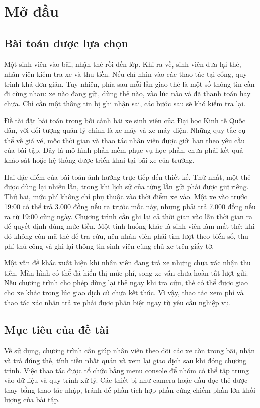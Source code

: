 \chapter{Mở đầu}
\label{chap:introduction}

\section{Bài toán được lựa chọn}
Một sinh viên vào bãi, nhận thẻ rồi đến lớp. Khi ra về, sinh viên đưa lại thẻ, nhân viên kiểm tra xe và thu tiền. Nếu chỉ nhìn vào các thao tác tại cổng, quy trình khá đơn giản. Tuy nhiên, phía sau mỗi lần giao thẻ là một số thông tin cần đi cùng nhau: xe nào đang gửi, dùng thẻ nào, vào lúc nào và đã thanh toán hay chưa. Chỉ cần một thông tin bị ghi nhận sai, các bước sau sẽ khó kiểm tra lại.

Đề tài đặt bài toán trong bối cảnh bãi xe sinh viên của Đại học Kinh tế Quốc dân, với đối tượng quản lý chính là xe máy và xe máy điện. Những quy tắc cụ thể về giá vé, mốc thời gian và thao tác nhân viên được giới hạn theo yêu cầu của bài tập. Đây là mô hình phần mềm phục vụ học phần, chưa phải kết quả khảo sát hoặc hệ thống được triển khai tại bãi xe của trường.

Hai đặc điểm của bài toán ảnh hưởng trực tiếp đến thiết kế. Thứ nhất, một thẻ được dùng lại nhiều lần, trong khi lịch sử của từng lần gửi phải được giữ riêng. Thứ hai, mức phí không chỉ phụ thuộc vào thời điểm xe vào. Một xe vào trước 19:00 có thể trả 3.000 đồng nếu ra trước mốc này, nhưng phải trả 7.000 đồng nếu ra từ 19:00 cùng ngày. Chương trình cần ghi lại cả thời gian vào lẫn thời gian ra để quyết định đúng mức tiền. Một tình huống khác là sinh viên làm mất thẻ: khi đó không còn mã thẻ để tra cứu, nên nhân viên phải tìm lượt theo biển số, thu phí thủ công và ghi lại thông tin sinh viên cùng chủ xe trên giấy tờ.

Một vấn đề khác xuất hiện khi nhân viên đang trả xe nhưng chưa xác nhận thu tiền. Màn hình có thể đã hiển thị mức phí, song xe vẫn chưa hoàn tất lượt gửi. Nếu chương trình cho phép dùng lại thẻ ngay khi tra cứu, thẻ có thể được giao cho xe khác trong lúc giao dịch cũ chưa kết thúc. Vì vậy, thao tác xem phí và thao tác xác nhận trả xe phải được phân biệt ngay từ yêu cầu nghiệp vụ.

\section{Mục tiêu của đề tài}
Về sử dụng, chương trình cần giúp nhân viên theo dõi các xe còn trong bãi, nhận và trả đúng thẻ, tính tiền nhất quán và xem lại giao dịch sau khi đóng chương trình. Việc thao tác được tổ chức bằng menu console để nhóm có thể tập trung vào dữ liệu và quy trình xử lý. Các thiết bị như camera hoặc đầu đọc thẻ được thay bằng thao tác nhập, tránh để phần tích hợp phần cứng chiếm phần lớn khối lượng của bài tập.

